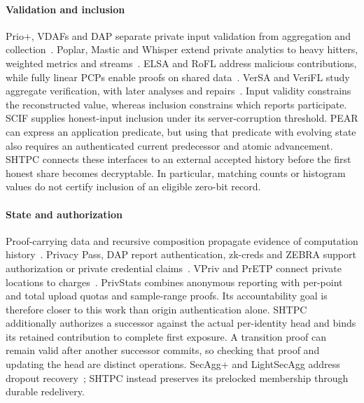 \documentclass[conference,compsoc]{IEEEtran}
\theoremstyle{definition}
\numberwithin{equation}{section}
\numberwithin{table}{section}
\numberwithin{figure}{section}
\theoremstyle{plain}
\begin{document}
\paragraph{Validation and inclusion}
Prio+, VDAFs and DAP separate private input validation from aggregation and
collection~\cite{Addanki2022PrioPlus,Barnes2023VDAF08,Geoghegan2026DAP,Davis2023VDAFPrivacy}.
Poplar, Mastic and Whisper extend private analytics to heavy hitters, weighted
metrics and streams~\cite{Boneh2021Poplar,Mouris2025Mastic,Rathee2024Whisper}.
ELSA and RoFL address malicious contributions, while fully linear PCPs enable
proofs on shared data~\cite{Rathee2023ELSA,Lycklama2023RoFL,Boneh2019FullyLinear}.
VerSA and VeriFL study aggregate verification, with later analyses and
repairs~\cite{Hahn2023VerSA,Luo2024VerSAComments,Guo2021VeriFL,Guo2022VeriFLFix}.
Input validity constrains the reconstructed value, whereas inclusion constrains
which reports participate. SCIF supplies honest-input inclusion under its
server-corruption threshold. PEAR can express an application predicate, but
using that predicate with evolving state also requires an authenticated current
predecessor and atomic advancement. SHTPC connects these interfaces to an
external accepted history before the first honest share becomes decryptable.
In particular, matching counts or histogram values do not certify inclusion of
an eligible zero-bit record.

\paragraph{State and authorization}
Proof-carrying data and recursive composition propagate evidence of computation
history~\cite{Chiesa2010PCD,Bitansky2012Recursive}. Privacy Pass, DAP report
authentication, zk-creds and ZEBRA support authorization or private credential
claims~\cite{Davidson2024PrivacyPass,Priebe2023ReportAuth,Rosenberg2023ZKCreds,Rathee2022Zebra}.
VPriv and PrETP connect private locations to charges~\cite{Popa2009VPriv,Balasch2010PrETP}.
PrivStats combines anonymous reporting with per-point and total upload quotas
and sample-range proofs. Its accountability goal is therefore closer to this
work than origin authentication alone. SHTPC additionally authorizes a successor
against the actual per-identity head and binds its retained contribution to
complete first exposure. A transition proof can remain valid after another
successor commits, so checking that proof and updating the head are distinct
operations. SecAgg+ and LightSecAgg address dropout recovery~\cite{Bell2020SecAggPlus,So2022LightSecAgg};
SHTPC instead preserves its prelocked membership through durable redelivery.
\end{document}
